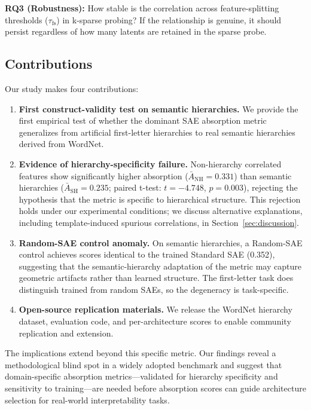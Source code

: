 \documentclass{article}
\begin{document}
\textbf{RQ3 (Robustness):} How stable is the correlation across feature-splitting thresholds ($\tau_{\text{fs}}$) in k-sparse probing? If the relationship is genuine, it should persist regardless of how many latents are retained in the sparse probe.

\subsection{Contributions}

Our study makes four contributions:

\begin{enumerate}
\item \textbf{First construct-validity test on semantic hierarchies.} We provide the first empirical test of whether the dominant SAE absorption metric generalizes from artificial first-letter hierarchies to real semantic hierarchies derived from WordNet.

\item \textbf{Evidence of hierarchy-specificity failure.} Non-hierarchy correlated features show significantly higher absorption ($\bar{A}_{\text{NH}} = 0.331$) than semantic hierarchies ($\bar{A}_{\text{SH}} = 0.235$; paired t-test: $t = -4.748$, $p = 0.003$), rejecting the hypothesis that the metric is specific to hierarchical structure. This rejection holds under our experimental conditions; we discuss alternative explanations, including template-induced spurious correlations, in Section~\ref{sec:discussion}.

\item \textbf{Random-SAE control anomaly.} On semantic hierarchies, a Random-SAE control achieves scores identical to the trained Standard SAE (0.352), suggesting that the semantic-hierarchy adaptation of the metric may capture geometric artifacts rather than learned structure. The first-letter task does distinguish trained from random SAEs, so the degeneracy is task-specific.

\item \textbf{Open-source replication materials.} We release the WordNet hierarchy dataset, evaluation code, and per-architecture scores to enable community replication and extension.
\end{enumerate}

The implications extend beyond this specific metric. Our findings reveal a methodological blind spot in a widely adopted benchmark and suggest that domain-specific absorption metrics---validated for hierarchy specificity and sensitivity to training---are needed before absorption scores can guide architecture selection for real-world interpretability tasks.
\end{document}
